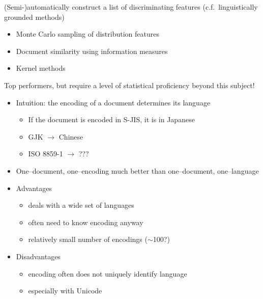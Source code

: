 \documentclass[a4paper,landscape,headrule,footrule,xetex]{foils}
\begin{document}

(Semi-)automatically construct a list of discriminating features (c.f.\
linguistically grounded methods)
\begin{itemize}
\item Monte Carlo sampling of distribution features %
\item Document similarity using information measures %
\item Kernel methods %
\end{itemize}
Top performers, but require a level of statistical proficiency beyond this
subject!




\begin{itemize}
\item Intuition: the encoding of a document determines its language
\begin{itemize}
\item If the document is encoded in S-JIS, it is in Japanese
\item GJK $\rightarrow$ Chinese
\item ISO 8859-1 $\rightarrow$ ???
\end{itemize}
\item One--document, one--encoding much better than one--document, one--language
\vspace{150pt}
\pagebreak
\item Advantages
  \begin{itemize}
  \item deals with a wide set of languages
  \item often need to know encoding anyway
  \item relatively small number of encodings ($\sim$100?)
  \end{itemize}
\item Disadvantages
  \begin{itemize}
  \item encoding often does not uniquely identify language
  \item especially with Unicode
  \end{itemize}
\end{itemize}





\end{document}
